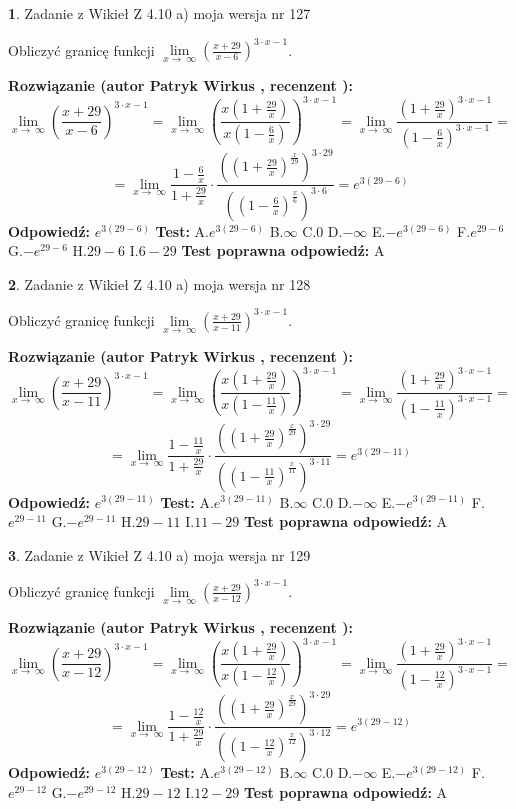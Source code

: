 \documentclass[12pt, a4paper]{article}
\theoremstyle{definition} %
\newtheorem{zad}{}
\newcommand{\zadStart}[1]{\begin{zad}#1\newline}
\newcommand{\zadStop}{\end{zad}}
\newcommand{\rozwStart}[2]{\noindent \textbf{Rozwiązanie (autor #1 , recenzent #2): }\newline}
\newcommand{\rozwStop}{\newline}
\newcommand{\odpStart}{\noindent \textbf{Odpowiedź:}\newline}
\newcommand{\odpStop}{\newline}
\newcommand{\testStart}{\noindent \textbf{Test:}\newline}
\newcommand{\testStop}{\newline}
\newcommand{\kluczStart}{\noindent \textbf{Test poprawna odpowiedź:}\newline}
\newcommand{\kluczStop}{\newline}
\begin{document}
\zadStart{Zadanie z Wikieł Z 4.10 a) moja wersja nr 127}


Obliczyć granicę funkcji  $\lim\limits_{x\to\ \infty}(\frac{x+29}{x-6})^{3\cdot x-1}$.
\zadStop
\rozwStart{Patryk Wirkus}{}
$$\lim\limits_{x\to\ \infty}(\frac{x+29}{x-6})^{3\cdot x-1} = \lim\limits_{x\to\ \infty}(\frac{x(1+\frac{29}{x})}{x(1-\frac{6}{x})})^{3\cdot x-1}=\lim\limits_{x\to\ \infty}\frac{(1+\frac{29}{x})^{3\cdot x-1}}{(1-\frac{6}{x})^{3\cdot x-1}}=$$
$$=\lim\limits_{x\to\ \infty}\frac{1-\frac{6}{x}}{1+\frac{29}{x}}\cdot\frac{((1+\frac{29}{x})^{\frac{x}{29}})^{3\cdot29}}{((1-\frac{6}{x})^{\frac{x}{6}})^{3\cdot6}}=e^{3(29-6)}$$
\rozwStop
\odpStart
$e^{3(29-6)}$
\odpStop
\testStart
A.$e^{3(29-6)}$ B.$\infty$ C.$0$ D.$-\infty$ E.$-e^{3(29-6)}$
F.$e^{29-6}$ G.$-e^{29-6}$
H.$29-6$
I.$6-29$
\testStop
\kluczStart
A
\kluczStop



\zadStart{Zadanie z Wikieł Z 4.10 a) moja wersja nr 128}


Obliczyć granicę funkcji  $\lim\limits_{x\to\ \infty}(\frac{x+29}{x-11})^{3\cdot x-1}$.
\zadStop
\rozwStart{Patryk Wirkus}{}
$$\lim\limits_{x\to\ \infty}(\frac{x+29}{x-11})^{3\cdot x-1} = \lim\limits_{x\to\ \infty}(\frac{x(1+\frac{29}{x})}{x(1-\frac{11}{x})})^{3\cdot x-1}=\lim\limits_{x\to\ \infty}\frac{(1+\frac{29}{x})^{3\cdot x-1}}{(1-\frac{11}{x})^{3\cdot x-1}}=$$
$$=\lim\limits_{x\to\ \infty}\frac{1-\frac{11}{x}}{1+\frac{29}{x}}\cdot\frac{((1+\frac{29}{x})^{\frac{x}{29}})^{3\cdot29}}{((1-\frac{11}{x})^{\frac{x}{11}})^{3\cdot11}}=e^{3(29-11)}$$
\rozwStop
\odpStart
$e^{3(29-11)}$
\odpStop
\testStart
A.$e^{3(29-11)}$ B.$\infty$ C.$0$ D.$-\infty$ E.$-e^{3(29-11)}$
F.$e^{29-11}$ G.$-e^{29-11}$
H.$29-11$
I.$11-29$
\testStop
\kluczStart
A
\kluczStop



\zadStart{Zadanie z Wikieł Z 4.10 a) moja wersja nr 129}


Obliczyć granicę funkcji  $\lim\limits_{x\to\ \infty}(\frac{x+29}{x-12})^{3\cdot x-1}$.
\zadStop
\rozwStart{Patryk Wirkus}{}
$$\lim\limits_{x\to\ \infty}(\frac{x+29}{x-12})^{3\cdot x-1} = \lim\limits_{x\to\ \infty}(\frac{x(1+\frac{29}{x})}{x(1-\frac{12}{x})})^{3\cdot x-1}=\lim\limits_{x\to\ \infty}\frac{(1+\frac{29}{x})^{3\cdot x-1}}{(1-\frac{12}{x})^{3\cdot x-1}}=$$
$$=\lim\limits_{x\to\ \infty}\frac{1-\frac{12}{x}}{1+\frac{29}{x}}\cdot\frac{((1+\frac{29}{x})^{\frac{x}{29}})^{3\cdot29}}{((1-\frac{12}{x})^{\frac{x}{12}})^{3\cdot12}}=e^{3(29-12)}$$
\rozwStop
\odpStart
$e^{3(29-12)}$
\odpStop
\testStart
A.$e^{3(29-12)}$ B.$\infty$ C.$0$ D.$-\infty$ E.$-e^{3(29-12)}$
F.$e^{29-12}$ G.$-e^{29-12}$
H.$29-12$
I.$12-29$
\testStop
\kluczStart
A
\kluczStop
\end{document}
